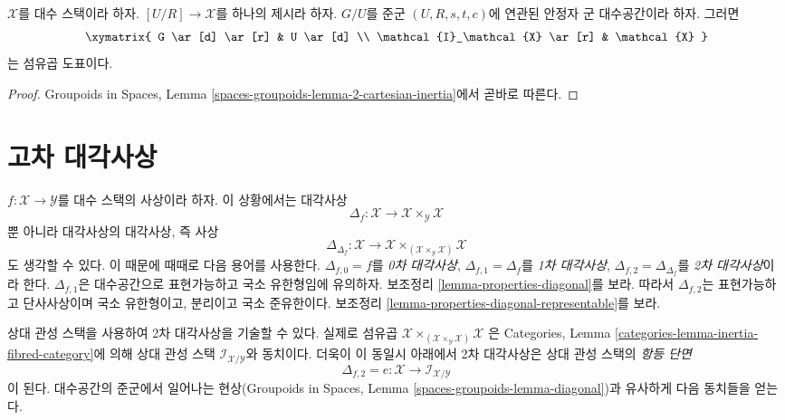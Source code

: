 \begin{lemma}
\label{lemma-presentation-inertia}
$\mathcal{X}$를 대수 스택이라 하자. $[U/R] \to \mathcal{X}$를
하나의 제시라 하자. $G/U$를 준군 $(U, R, s, t, c)$에 연관된
안정자 군 대수공간이라 하자. 그러면
$$
\xymatrix{
G \ar[d] \ar[r] & U \ar[d] \\
\mathcal{I}_\mathcal{X} \ar[r] & \mathcal{X}
}
$$
는 섬유곱 도표이다.
\end{lemma}

\begin{proof}
Groupoids in Spaces, Lemma
\ref{spaces-groupoids-lemma-2-cartesian-inertia}에서 곧바로 따른다.
\end{proof}









\section{고차 대각사상}
\label{section-higher-diagonals}

\noindent
$f : \mathcal{X} \to \mathcal{Y}$를 대수 스택의 사상이라 하자.
이 상황에서는 대각사상
$$
\Delta_f : \mathcal{X} \to \mathcal{X} \times_\mathcal{Y} \mathcal{X}
$$
뿐 아니라 대각사상의 대각사상, 즉 사상
$$
\Delta_{\Delta_f} :
\mathcal{X}
\longrightarrow
\mathcal{X} \times_{(\mathcal{X} \times_\mathcal{Y} \mathcal{X})} \mathcal{X}
$$
도 생각할 수 있다. 이 때문에 때때로 다음 용어를 사용한다.
$\Delta_{f, 0} = f$를 {\it 0차 대각사상},
$\Delta_{f, 1} = \Delta_f$를 {\it 1차 대각사상},
$\Delta_{f, 2} = \Delta_{\Delta_f}$를 {\it 2차 대각사상}이라 한다.
$\Delta_{f, 1}$은 대수공간으로 표현가능하고 국소 유한형임에 유의하자.
보조정리 \ref{lemma-properties-diagonal}를 보라.
따라서 $\Delta_{f, 2}$는 표현가능하고 단사사상이며 국소 유한형이고,
분리이고 국소 준유한이다. 보조정리
\ref{lemma-properties-diagonal-representable}를 보라.

\medskip\noindent
상대 관성 스택을 사용하여 2차 대각사상을 기술할 수 있다.
실제로 섬유곱
$\mathcal{X}
\times_{(\mathcal{X} \times_\mathcal{Y} \mathcal{X})} \mathcal{X}$
은 Categories, Lemma \ref{categories-lemma-inertia-fibred-category}에 의해
상대 관성 스택 $\mathcal{I}_{\mathcal{X}/\mathcal{Y}}$와 동치이다.
더욱이 이 동일시 아래에서 2차 대각사상은 상대 관성 스택의
{\it 항등 단면}
$$
\Delta_{f, 2} = e : \mathcal{X} \to \mathcal{I}_{\mathcal{X}/\mathcal{Y}}
$$
이 된다. 대수공간의 준군에서 일어나는 현상(Groupoids in Spaces, Lemma
\ref{spaces-groupoids-lemma-diagonal})과 유사하게 다음 동치들을 얻는다.

